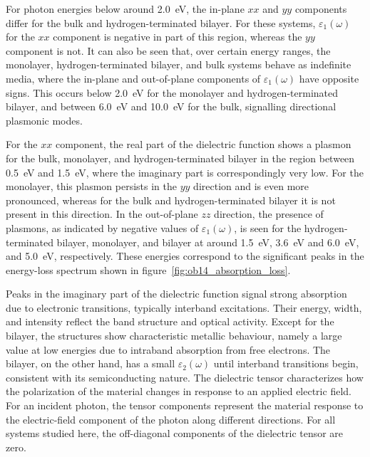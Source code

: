 For photon energies below around \qty{2.0}{\electronvolt},
the in-plane $xx$ and $yy$ components differ for the bulk and hydrogen-terminated bilayer.
For these systems, $\varepsilon_{1}(\omega)$ for the $xx$ component is negative in part of this region,
whereas the $yy$ component is not.
It can also be seen that, over certain energy ranges,
the monolayer, hydrogen-terminated bilayer, and bulk systems behave as indefinite media,
where the in-plane and out-of-plane components of $\varepsilon_{1}(\omega)$ have opposite signs.
This occurs below \qty{2.0}{\electronvolt} for the monolayer and hydrogen-terminated bilayer,
and between \qty{6.0}{\electronvolt} and \qty{10.0}{\electronvolt} for the bulk,
signalling directional plasmonic modes.

For the $xx$ component,
the real part of the dielectric function shows a plasmon for the bulk,
monolayer, and hydrogen-terminated bilayer in the region between \qty{0.5}{\electronvolt} and \qty{1.5}{\electronvolt},
where the imaginary part is correspondingly very low.
For the monolayer, this plasmon persists in the $yy$ direction and is even more pronounced,
whereas for the bulk and hydrogen-terminated bilayer it is not present in this direction.
In the out-of-plane $zz$ direction, the presence of plasmons,
as indicated by negative values of $\varepsilon_{1}(\omega)$, is seen for the hydrogen-terminated bilayer, monolayer,
and bilayer at around \qty{1.5}{\electronvolt}, \qty{3.6}{\electronvolt} and \qty{6.0}{\electronvolt}, and \qty{5.0}{\electronvolt}, respectively.
These energies correspond to the significant peaks in the energy-loss spectrum shown in figure~\ref{fig:ob14_absorption_loss}.

Peaks in the imaginary part of the dielectric function signal strong absorption due to electronic transitions,
typically interband excitations. Their energy, width, and intensity reflect the band structure and optical activity.
Except for the bilayer, the structures show characteristic metallic behaviour,
namely a large value at low energies due to intraband absorption from free electrons.
The bilayer, on the other hand,
has a small $\varepsilon_{2}(\omega)$ until interband transitions begin,
consistent with its semiconducting nature.
The dielectric tensor characterizes how the polarization of the material changes in response to an applied electric field.
For an incident photon,
the tensor components represent the material response to the electric-field component of the photon along different directions.
For all systems studied here,
the off-diagonal components of the dielectric tensor are zero.

